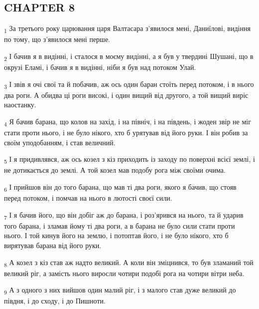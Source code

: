 \subsection{CHAPTER 8}
\begin{tcolorbox}
\textsubscript{1} За третього року царювання царя Валтасара з'явилося мені, Даниїлові, видіння по тому, що з'явилося мені перше.
\end{tcolorbox}
\begin{tcolorbox}
\textsubscript{2} І бачив я в видінні, і сталося в моєму видінні, а я був у твердині Шушані, що в окрузі Еламі, і бачив я в видінні, ніби я був над потоком Улай.
\end{tcolorbox}
\begin{tcolorbox}
\textsubscript{3} І звів я очі свої та й побачив, аж ось один баран стоїть перед потоком, і в нього два роги. А обидва ці роги високі, і один вищий від другого, а той вищий виріс наостанку.
\end{tcolorbox}
\begin{tcolorbox}
\textsubscript{4} Я бачив барана, що колов на захід, і на північ, і на південь, і жоден звір не міг стати проти нього, і не було нікого, хто б урятував від його руки. І він робив за своїм уподобанням, і став величний.
\end{tcolorbox}
\begin{tcolorbox}
\textsubscript{5} І я придивлявся, аж ось козел з кіз приходить із заходу по поверхні всієї землі, і не дотикається до землі. А той козел мав подобу рога між своїми очима.
\end{tcolorbox}
\begin{tcolorbox}
\textsubscript{6} І прийшов він до того барана, що мав ті два роги, якого я бачив, що стояв перед потоком, і помчав на нього в лютості своєї сили.
\end{tcolorbox}
\begin{tcolorbox}
\textsubscript{7} І я бачив його, що він добіг аж до барана, і роз'ярився на нього, та й ударив того барана, і зламав йому ті два роги, а в барана не було сили стати проти нього. І той кинув його на землю, і потоптав його, і не було нікого, хто б вирятував барана від його руки.
\end{tcolorbox}
\begin{tcolorbox}
\textsubscript{8} А козел з кіз став аж надто великий. А коли він зміцнився, то був зламаний той великий ріг, а замість нього виросли чотири подобі рога на чотири вітри неба.
\end{tcolorbox}
\begin{tcolorbox}
\textsubscript{9} А з одного з них вийшов один малий ріг, і з малого став дуже великий до півдня, і до сходу, і до Пишноти.
\end{tcolorbox}
